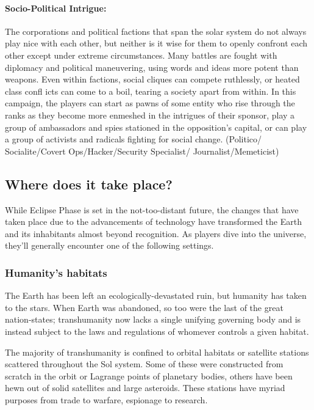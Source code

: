 \paragraph{Socio-Political Intrigue:} The corporations and political factions that span the solar system do not always play nice with each other, but neither is it wise for them to openly confront each other except under extreme circumstances. Many battles are fought with diplomacy and political maneuvering, using words and ideas more potent than weapons. Even within factions, social cliques can compete ruthlessly, or heated class confl icts can come to a boil, tearing a society apart from within. In this campaign, the players can start as pawns of some entity who rise through the ranks as they become more enmeshed in the intrigues of their sponsor, play a group of ambassadors and spies stationed in the opposition's capital, or can play a group of activists and radicals fighting for social change. (Politico/ Socialite/Covert Ops/Hacker/Security Specialist/ Journalist/Memeticist) 



\subsection{Where does it take place?} \label{sec:where-does-it} 

While Eclipse Phase is set in the not-too-distant future, the changes that have taken place due to the advancements of technology have transformed the Earth and its inhabitants almost beyond recognition. As players dive into the universe, they'll generally encounter one of the following settings. 



\subsubsection{Humanity's habitats} \label{sec:humanitys-habitats} 

The Earth has been left an ecologically-devastated ruin, but humanity has taken to the stars. When Earth was abandoned, so too were the last of the great nation-states; transhumanity now lacks a single unifying governing body and is instead subject to the laws and regulations of whomever controls a given habitat. 

The majority of transhumanity is confined to orbital habitats or satellite stations scattered throughout the Sol system. Some of these were constructed from scratch in the orbit or Lagrange points of planetary bodies, others have been hewn out of solid satellites and large asteroids. These stations have myriad purposes from trade to warfare, espionage to research. 


